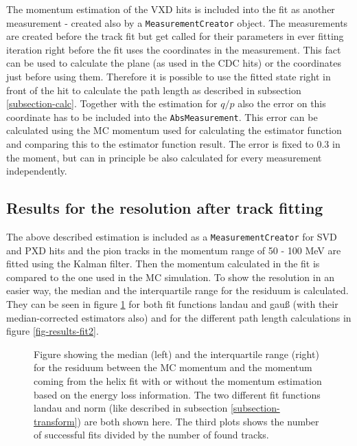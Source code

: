 The momentum estimation of the VXD hits is included into the fit as another measurement - created also by a \texttt{MeasurementCreator} object. The measurements are created before the track fit but get called for their parameters in ever fitting iteration right before the fit uses the coordinates in the measurement. This fact can be used to calculate the plane (as used in the CDC hits) or the coordinates just before using them. Therefore it is possible to use the fitted state right in front of the hit to calculate the path length as described in subsection \ref{subsection-calc}. Together with the estimation for $q/p$ also the error on this coordinate has to be included into the \texttt{AbsMeasurement}. This error can be calculated using the MC momentum used for calculating the estimator function and comparing this to the estimator function result. The error is fixed to 0.3 in the moment, but can in principle be also calculated for every measurement independently.

\subsection{Results for the resolution after track fitting}

The above described estimation is included as a \texttt{MeasurementCreator} for SVD and PXD hits and the pion tracks in the momentum range of 50 - 100 MeV are fitted using the Kalman filter. Then the momentum calculated in the fit is compared to the one used in the MC simulation. To show the resolution in an easier way, the median and the interquartile range for the residuum is calculated. They can be seen in figure \ref{fig-results-fit} for both fit functions landau and gauß (with their median-corrected estimators also) and for the different path length calculations in figure \ref{fig-results-fit2}.

\begin{figure}
  \centering
  \caption[Residuum of the momentum estimation for different fit functions.]{Figure showing the median (left) and the interquartile range (right) for the residuum between the MC momentum and the momentum coming from the helix fit with or without the momentum estimation based on the energy loss information. The two different fit functions landau and norm (like described in subsection \ref{subsection-transform}) are both shown here. The third plots shows the number of successful fits divided by the number of found tracks.}
  \label{fig-results-fit}
\end{figure}



